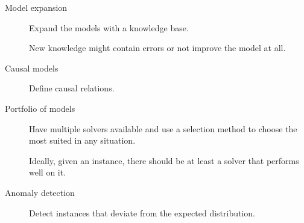 \begin{description}
    \item[Model expansion] 
        Expand the models with a knowledge base.

        \begin{remark}
            New knowledge might contain errors or not improve the model at all.
        \end{remark}
    
    \item[Causal models] 
        Define causal relations.
    
    \item[Portfolio of models] 
        Have multiple solvers available and use a selection method to choose the most suited in any situation.

        \begin{remark}
            Ideally, given an instance, there should be at least a solver that performs well on it.
        \end{remark}
    
    \item[Anomaly detection] 
        Detect instances that deviate from the expected distribution.
\end{description}
